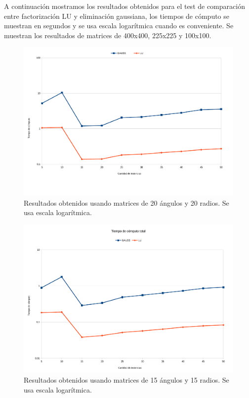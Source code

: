 A continuación mostramos los resultados obtenidos para el test de comparación entre factorización LU y eliminación gaussiana, los tiempos de cómputo se muestran en segundos y se usa escala logarítmica cuando es conveniente. Se muestran los resultados de matrices de 400x400, 225x225 y 100x100. 


\begin{figure}[H]{}
\centering
\includegraphics[scale=0.5]{graphs/gaussVsLU1.pdf}
\caption{Resultados obtenidos usando matrices de 20 ángulos y 20 radios. Se usa escala logarítmica.}
\label{gaussVsLU1}
\end{figure}

\begin{figure}[H]{}
\centering
\includegraphics[scale=0.5]{graphs/gaussVsLU2.pdf}
\caption{Resultados obtenidos usando matrices de 15 ángulos y 15 radios. Se usa escala logarítmica.}
\label{gaussVsLU2}
\end{figure}

